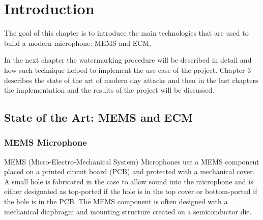 \graphicspath{ {LiveAudioWatermarking/Images/} }
\chapter{Introduction}
The goal of this chapter is to introduce the main technologies that are used to build a modern microphone: MEMS and ECM. 


In the next chapter the watermarking procedure will be described in detail and how such technique helped to implement the use case of the project. \newline
Chapter 3 describes the state of the art of modern day attacks and then in the last chapters the implementation and the results of the project will be discussed.
\section{State of the Art: MEMS and ECM}
\subsection{MEMS Microphone}
MEMS (Micro-Electro-Mechanical System) Microphones use a MEMS component placed on a printed circuit board (PCB) and protected with a mechanical cover. A small hole is fabricated in the case to allow sound into the microphone and is either designated as top-ported if the hole is in the top cover or bottom-ported if the hole is in the PCB. The MEMS component is often designed with a mechanical diaphragm and mounting structure created on a semiconductor die.
